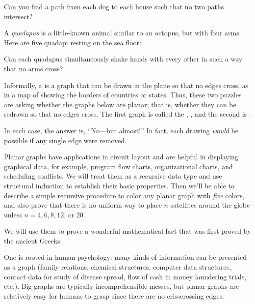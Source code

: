 \begin{center}

\end{center}

Can you find a path from each dog to each house such that no
two paths intersect?

A \emph{quadapus} is a little-known animal similar to an octopus,
but with four arms.  Here are five quadapi resting on the sea floor:


\begin{center}

\end{center}

Can each quadapus simultaneously shake hands with every other in such a
way that no arms cross?

Informally, a  is a graph that can be drawn in the
plane so that no edges cross, as in a map of showing the borders of
countries or states.  Thus, these two puzzles are asking whether the
graphs below are planar; that is, whether they can be redrawn so that no
edges cross.  The first graph is called the , , and the second is .

\begin{center}

\end{center}

In each case, the answer is, ``No---but almost!''  In fact, each drawing
\emph{would} be possible if any single edge were removed.

Planar graphs have applications in circuit layout and are helpful in
displaying graphical data, for example, program flow charts, organizational
charts, and scheduling conflicts.  We will treat them as a recursive data
type and use structural induction to establish their basic properties.
Then we'll be able to describe a simple recursive procedure to color any
planar graph with \emph{five} colors, and also prove that there is no
uniform way to place $n$ satellites around the globe unless $n = 4,6,8,12$,
or $20$.

\begin{editingnotes}
We will use them to
prove a wonderful mathematical fact that was first proved by the ancient
Greeks.
\end{editingnotes}

\begin{editingnotes}
One is rooted in human psychology: many kinds of information can
be presented as a graph (family relations, chemical structures, computer
data structures, contact data for study of disease spread, flow of cash in
money laundering trials, etc.).  Big graphs are typically incomprehensible
messes, but planar graphs are relatively easy for humans to grasp since
there are no crisscrossing edges.
\end{editingnotes}


